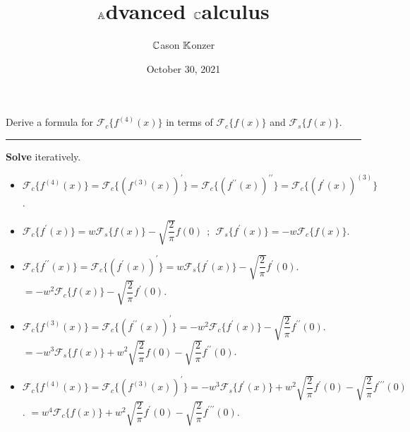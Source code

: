 \documentclass[10pt]{article}
\title{$\mathbb{A}$dvanced $\mathbb{C}$alculus}
\author{$\mathbb{C}$ason $\mathbb{K}$onzer}
\date{October 30, 2021}
\begin{document}
\maketitle

\newpage

\section{\underline{}}
\label{sec: Problem 1}
\noindent
Derive a formula for $ \mathcal{F}_c\{f^{(4)}(x)\} $ in terms of $ \mathcal{F}_c\{f(x)\} $ and $ \mathcal{F}_s\{f(x)\} $. \\
\vspace{2.5mm}
\hrule 

\vspace{7.5mm}

\noindent
\textbf{Solve} iteratively. \\

\begin{itemize}
    \item $ \mathcal{F}_c\{f^{(4)}(x)\} = \mathcal{F}_c\{(f^{(3)}(x))^\prime\} 
    = \mathcal{F}_c\{(f^{\prime\prime}(x))^{\prime\prime}\} 
    = \mathcal{F}_c\{(f^{\prime}(x))^{(3)}\} $.
    \vspace{2.5mm}
    \item $ \displaystyle \mathcal{F}_c\{f^{\prime}(x)\} = w\mathcal{F}_s\{f(x)\} - \sqrt{\dfrac{2}{\pi}}f(0) \ \ 
    ; \ \ \mathcal{F}_s\{f^{\prime}(x)\} = -w\mathcal{F}_c\{f(x)\} $.
    \vspace{2.5mm}
    \item $ \displaystyle \mathcal{F}_c\{f^{\prime\prime}(x)\} 
    = \mathcal{F}_c\{(f^{\prime}(x))^{\prime}\} 
    = w\mathcal{F}_s\{f^{\prime}(x)\} - \sqrt{\dfrac{2}{\pi}}f^{\prime}(0) $.
    \vspace{2.5mm}
    \subitem $ \displaystyle = -w^2\mathcal{F}_c\{f(x)\} - \sqrt{\dfrac{2}{\pi}}f^{\prime}(0) $.
    \vspace{2.5mm}
    \item $ \displaystyle \mathcal{F}_c\{f^{(3)}(x)\} 
    = \mathcal{F}_c\{(f^{\prime\prime}(x))^{\prime}\} 
    = -w^2\mathcal{F}_c\{f^{\prime}(x)\} - \sqrt{\dfrac{2}{\pi}}f^{\prime\prime}(0) $.
    \vspace{2.5mm}
    \subitem $ \displaystyle = -w^3\mathcal{F}_s\{f(x)\} + w^2\sqrt{\dfrac{2}{\pi}}f(0) - \sqrt{\dfrac{2}{\pi}}f^{\prime\prime}(0) $.
    \vspace{2.5mm}
    \item $ \displaystyle \mathcal{F}_c\{f^{(4)}(x)\} 
    = \mathcal{F}_c\{(f^{(3)}(x))^{\prime}\} 
    = -w^3\mathcal{F}_s\{f^{\prime}(x)\} + w^2\sqrt{\dfrac{2}{\pi}}f^{\prime}(0) - \sqrt{\dfrac{2}{\pi}}f^{\prime\prime\prime}(0) $.
    \vspace{2.5mm}
    \subitem $ \displaystyle = w^4\mathcal{F}_c\{f(x)\} + w^2\sqrt{\dfrac{2}{\pi}}f^{\prime}(0) - \sqrt{\dfrac{2}{\pi}}f^{\prime\prime\prime}(0) $.
\end{itemize}
\end{document}
